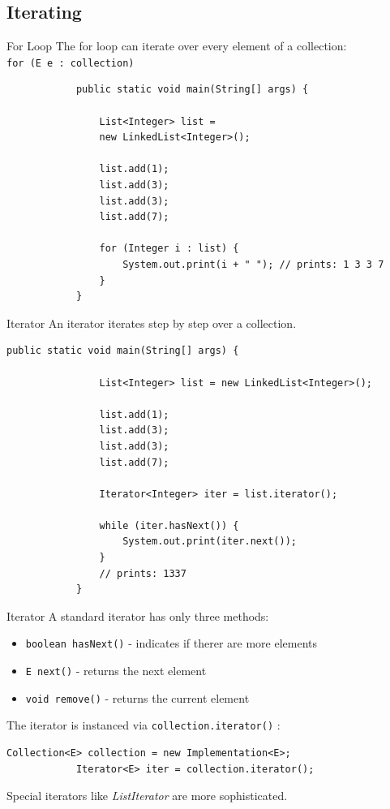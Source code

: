 	\subsection{Iterating}
	\begin{frame}[fragile]{For Loop}
		The for loop can iterate over every element of a collection:\\
		\hspace{1em}\texttt{for (E e : collection)}
		\begin{lstlisting}
			public static void main(String[] args) {
				
				List<Integer> list = 
				new LinkedList<Integer>();
				
				list.add(1);
				list.add(3);
				list.add(3);
				list.add(7);
				
				for (Integer i : list) {
					System.out.print(i + " "); // prints: 1 3 3 7
				}
			}
		\end{lstlisting}
	\end{frame}
	
	\begin{frame}[fragile]{Iterator}
		An iterator iterates step by step over a collection.
		\begin{lstlisting}[basicstyle=\ttfamily\scriptsize]
			public static void main(String[] args) {
				
				List<Integer> list = new LinkedList<Integer>();
				
				list.add(1);
				list.add(3);
				list.add(3);
				list.add(7);
				
				Iterator<Integer> iter = list.iterator();
				
				while (iter.hasNext()) {
					System.out.print(iter.next());
				}
				// prints: 1337
			}
		\end{lstlisting}
	\end{frame}
	
	\begin{frame}[fragile]{Iterator}
		A standard iterator has only three methods:
		\begin{itemize}
			\item \texttt{boolean hasNext()} - indicates if therer are more elements
			\item \texttt{E next()} - returns the next element
			\item \texttt{void remove()} - returns the current element
		\end{itemize}
		\vspace{1em}
		The iterator is instanced via \texttt{collection.iterator()} :
		\begin{lstlisting}[basicstyle=\ttfamily\scriptsize]
			Collection<E> collection = new Implementation<E>;
			Iterator<E> iter = collection.iterator();
		\end{lstlisting}
		Special iterators like \emph{ListIterator} are more sophisticated.
	\end{frame}
	
